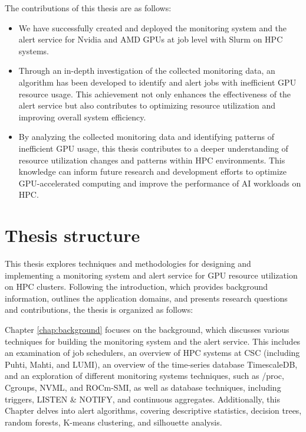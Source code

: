 The contributions of this thesis are as follows:

\begin{itemize}
    \item We have successfully created and deployed the monitoring system and the alert service for Nvidia and AMD GPUs at job level with Slurm on HPC systems.
    \item Through an in-depth investigation of the collected monitoring data, an algorithm has been developed to identify and alert jobs with inefficient GPU resource usage. This achievement not only enhances the effectiveness of the alert service but also contributes to optimizing resource utilization and improving overall system efficiency.
    \item By analyzing the collected monitoring data and identifying patterns of inefficient GPU usage, this thesis contributes to a deeper understanding of resource utilization changes and patterns within HPC environments. This knowledge can inform future research and development efforts to optimize GPU-accelerated computing and improve the performance of AI workloads on HPC.
\end{itemize}

\section{Thesis structure}

This thesis explores techniques and methodologies for designing and implementing a monitoring system and alert service for GPU resource utilization on HPC clusters. Following the introduction, which provides background information, outlines the application domains, and presents research questions and contributions, the thesis is organized as follows:

Chapter \ref{chap:background} focuses on the background, which discusses various techniques for building the monitoring system and the alert service. This includes an examination of job schedulers, an overview of HPC systems at CSC (including Puhti, Mahti, and LUMI), an overview of the time-series database TimescaleDB, and an exploration of different monitoring systems techniques, such as /proc, Cgroups, NVML, and ROCm-SMI, as well as database techniques, including triggers, LISTEN \& NOTIFY, and continuous aggregates. Additionally, this Chapter delves into alert algorithms, covering descriptive statistics, decision trees, random forests, K-means clustering, and silhouette analysis.

